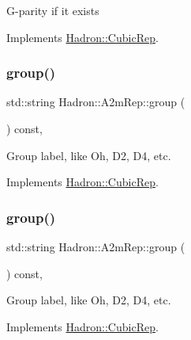 G-\/parity if it exists 

Implements \mbox{\hyperlink{structHadron_1_1CubicRep_a52104e43266d1614c00bbd1c3b395458}{Hadron\+::\+Cubic\+Rep}}.

\mbox{\label{structHadron_1_1A2mRep_a8f8bcb50489cf3fc66831ffc0b3d02c3}} 
\subsubsection{\texorpdfstring{group()}{group()}\hspace{0.1cm}{\footnotesize\ttfamily [1/3]}}
{\footnotesize\ttfamily std\+::string Hadron\+::\+A2m\+Rep\+::group (\begin{DoxyParamCaption}{ }\end{DoxyParamCaption}) const\hspace{0.3cm}{\ttfamily [inline]}, {\ttfamily [virtual]}}

Group label, like Oh, D2, D4, etc. 

Implements \mbox{\hyperlink{structHadron_1_1CubicRep_a0748f11ec87f387062c8e8981339a29c}{Hadron\+::\+Cubic\+Rep}}.

\mbox{\label{structHadron_1_1A2mRep_a8f8bcb50489cf3fc66831ffc0b3d02c3}} 
\subsubsection{\texorpdfstring{group()}{group()}\hspace{0.1cm}{\footnotesize\ttfamily [2/3]}}
{\footnotesize\ttfamily std\+::string Hadron\+::\+A2m\+Rep\+::group (\begin{DoxyParamCaption}{ }\end{DoxyParamCaption}) const\hspace{0.3cm}{\ttfamily [inline]}, {\ttfamily [virtual]}}

Group label, like Oh, D2, D4, etc. 

Implements \mbox{\hyperlink{structHadron_1_1CubicRep_a0748f11ec87f387062c8e8981339a29c}{Hadron\+::\+Cubic\+Rep}}.

\mbox{\label{structHadron_1_1A2mRep_a8f8bcb50489cf3fc66831ffc0b3d02c3}} 
